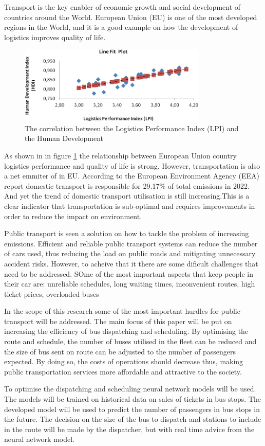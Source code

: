 \hspace{1em} Transport is the key enabler of economic growth and social development 
of countries around the World. European Union (EU) is one of the most developed regions in the World, 
and it is a good example on how the development of logistics improves quality of life. 
\begin{figure}[h]
    \centering
    \includegraphics[width=0.8\textwidth]{figures/correlation_HDI_LPI.png}
    \caption{The correlation between the Logistics Performance Index (LPI) and the Human Development\cite{HDIvsLPI}}
    \label{fig:correlation_HDI_LPI}
\end{figure}


As shown in in figure \ref*{fig:correlation_HDI_LPI} the relationship between European Union country 
logistics performance and quality of life is strong. However, transportation is also 
a net emmiter of  in EU. According to the European Environment Agency (EEA) report domestic
transport is responsible for 29.17\% of total  emissions in 2022\cite{EEA}. And yet the trend of 
domestic transport utilisation is still increasing.This is a clear indicator that transportation is sub-optimal and requires
 improvements in order to reduce the impact on environment. 

Public transport is seen a solution on how to tackle the problem of increasing  emissions.
Efficient and reliable public transport systems can reduce the number of cars used, thus reducing 
the load on public roads and mitigating unnecessary accident risks. However, to acheive that
it there are some dificult challenges that need to be addressed. SOme of the most important aspects
that keep people in their car are:
    unreliable schedules,
    long waiting times,
    inconvenient routes,
    high ticket prices,
    overloaded buses

In the scope of this research some of the most important hurdles for public transport will be addressed.
The main focus of this paper will be put on increasing the efficiency of bus dispatching and scheduling.
By optimising the route and schedule, the number of buses utilised in the fleet can be reduced and 
the size of bus sent on route can be adjusted to the number of passengers expected. 
By doing so, the costs of operations should decrease thus, making public transportation services more
affordable and attractive to the society.

To optimise the dispatching and scheduling neural network models will be used. The models will
be trained on historical data on sales of tickets in bus stops. The developed model will be
used to predict the number of passengers in bus stops in the future. The decision on the size of the bus
to dispatch and stations to include in the route will be made by the dispatcher, but with real time
advice from the neural network model. 
